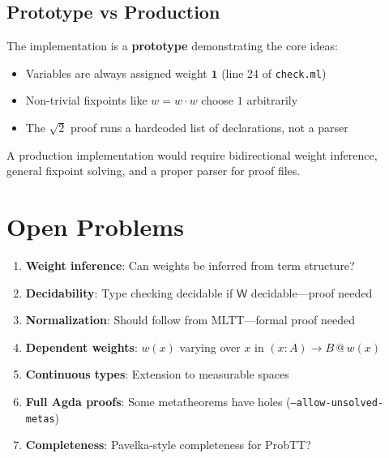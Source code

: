 \documentclass[11pt,a4paper]{article}
\makeatletter
\newcommand{\W}{\mathsf{W}}
\newcommand{\at}[1]{\,@\,#1}
\newcommand{\one}{\mathbf{1}}
\makeatother
\begin{document}
\subsection{Prototype vs Production}

The implementation is a \textbf{prototype} demonstrating the core ideas:
\begin{itemize}
    \item Variables are always assigned weight $\one$ (line 24 of \texttt{check.ml})
    \item Non-trivial fixpoints like $w = w \cdot w$ choose $1$ arbitrarily
    \item The $\sqrt{2}$ proof runs a hardcoded list of declarations, not a parser
\end{itemize}

A production implementation would require bidirectional weight inference, general fixpoint solving, and a proper parser for proof files.

\section{Open Problems}

\begin{enumerate}
    \item \textbf{Weight inference}: Can weights be inferred from term structure?
    \item \textbf{Decidability}: Type checking decidable if $\W$ decidable---proof needed
    \item \textbf{Normalization}: Should follow from MLTT---formal proof needed
    \item \textbf{Dependent weights}: $w(x)$ varying over $x$ in $(x : A) \to B \at{w(x)}$
    \item \textbf{Continuous types}: Extension to measurable spaces
    \item \textbf{Full Agda proofs}: Some metatheorems have holes (\texttt{--allow-unsolved-metas})
    \item \textbf{Completeness}: Pavelka-style completeness for ProbTT?
\end{enumerate}



\end{document}

